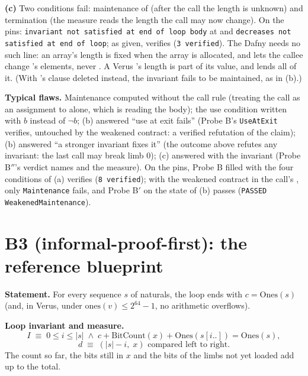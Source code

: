 \documentclass[11pt]{article}
\begin{document}
\textbf{(c)} Two conditions fail: maintenance of  (after
the call the length is unknown) and termination (the measure
 reads the length the call may now change). On the pins:
\texttt{invariant not satisfied at end of loop body} at 
and \texttt{decreases not satisfied at end of loop}; as given, 
verifies (\texttt{3 verified}). The Dafny  needs no such line: an
array's length is fixed when the array is allocated, and  lets
the callee change 's elements, never . A Verus
's length is part of its value, and  lends all of it. (With
's  clause deleted instead, the  invariant
fails to be maintained, as in (b).)

\textbf{Typical flaws.} Maintenance computed without the call rule (treating
the call as an assignment to  alone, which is reading the body);
the use condition written with $b$ instead of $\neg b$; (b) answered ``use at
exit fails'' (Probe B's \texttt{UseAtExit} verifies, untouched by the
weakened contract: a verified refutation of the claim); (b) answered ``a stronger invariant
fixes it'' (the outcome above refutes any invariant: the last call may break
limb 0); (c) answered with the  invariant (Probe B$''$'s verdict
names  and the measure). On the pins, Probe B filled with
the four conditions of (a) verifies (\texttt{8 verified}); with the weakened
contract in the call's , only \texttt{Maintenance} fails, and
Probe B$'$ on the state of (b) passes (\texttt{PASSED WeakenedMaintenance}).

\section*{B3 (informal-proof-first): the reference blueprint}

\textbf{Statement.} For every sequence $s$ of naturals, the loop ends with
$c = \mathrm{Ones}(s)$ (and, in Verus, under $\mathrm{ones}(v) \leq 2^{64} - 1$,
no arithmetic overflows).

\textbf{Loop invariant and measure.}
\[ I \;\equiv\; 0 \leq i \leq |s| \;\wedge\; c + \mathrm{BitCount}(x) +
   \mathrm{Ones}(s[i..]) = \mathrm{Ones}(s), \]
\[ d \;\equiv\; (|s| - i,\; x) \text{ compared left to right.} \]
The count so far, the bits still in $x$ and the bits of the limbs not yet
loaded add up to the total.
\end{document}
